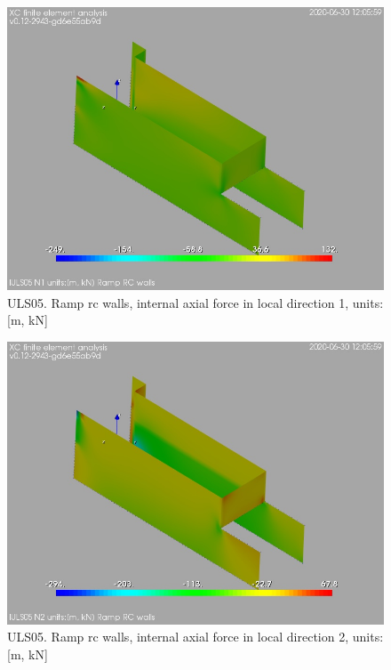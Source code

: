 \begin{figure}
\begin{center}
\includegraphics[width=\linewidth]{ramp_wall/resLC/text/graphics/resSimplLC/lULS05wallsN1}
\caption{ULS05. Ramp rc walls, internal axial force in local direction 1, units:[m, kN]}
\end{center}
\end{figure}
\begin{figure}
\begin{center}
\includegraphics[width=\linewidth]{ramp_wall/resLC/text/graphics/resSimplLC/lULS05wallsN2}
\caption{ULS05. Ramp rc walls, internal axial force in local direction 2, units:[m, kN]}
\end{center}
\end{figure}
